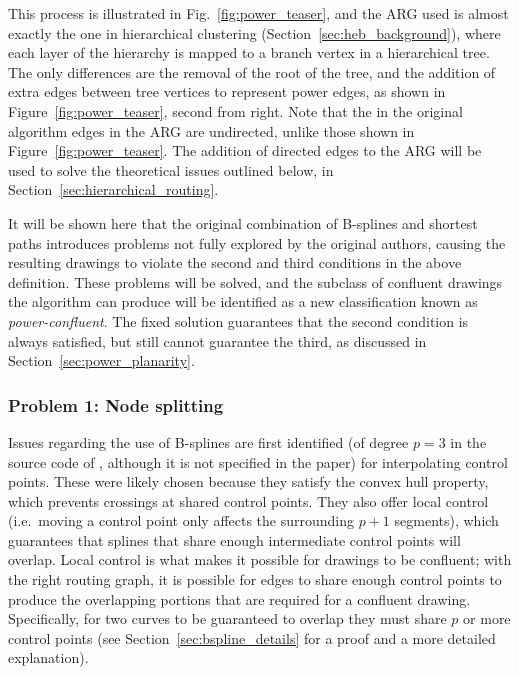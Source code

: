 This process is illustrated in Fig.~\ref{fig:power_teaser}, and the ARG used is almost exactly the one in hierarchical clustering (Section~\ref{sec:heb_background}), where each layer of the hierarchy is mapped to a branch vertex in a hierarchical tree.
The only differences are the removal of the root of the tree, and the addition of extra edges between tree vertices to represent power edges, as shown in Figure~\ref{fig:power_teaser}, second from right. Note that the in the original algorithm \cite{Bach2017} edges in the ARG are undirected, unlike those shown in Figure~\ref{fig:power_teaser}.
The addition of directed edges to the ARG will be used to solve the theoretical issues outlined below, in Section~\ref{sec:hierarchical_routing}.

It will be shown here that the original combination of B-splines and shortest paths introduces problems not fully explored by the original authors, causing the resulting drawings to violate the second and third conditions in the above definition. These problems will be solved, and the subclass of confluent drawings the algorithm can produce will be identified as a new classification known as \emph{power-confluent}. The fixed solution guarantees that the second condition is always satisfied, but still cannot guarantee the third, as discussed in Section~\ref{sec:power_planarity}.

\subsubsection{Problem 1: Node splitting}
\label{sec:node_split}
Issues regarding the use of B-splines are first identified (of degree $p=3$ in the source code of \cite{Bach2017}, although it is not specified in the paper) for interpolating control points.
These were likely chosen because they satisfy the convex hull property, which prevents crossings at shared control points. They also offer local control (i.e.\ moving a control point only affects the surrounding $p+1$ segments), which guarantees that splines that share enough intermediate control points will overlap.
Local control is what makes it possible for drawings to be confluent; with the right routing graph, it is possible for edges to share enough control points to produce the overlapping portions that are required for a confluent drawing. Specifically, for two curves to be guaranteed to overlap they must share $p$ or more control points (see Section~\ref{sec:bspline_details} for a proof and a more detailed explanation).

